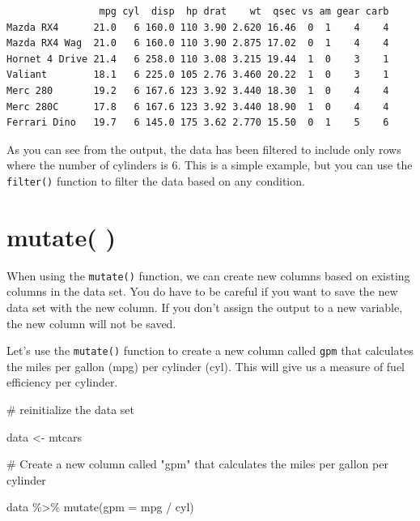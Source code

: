 \documentclass[
  letterpaper,
  DIV=11,
  numbers=noendperiod]{scrreprt}
\newenvironment{Shaded}{\begin{snugshade}}{\end{snugshade}}
\newcommand{\AttributeTok}[1]{\textcolor[rgb]{0.40,0.45,0.13}{#1}}
\newcommand{\CommentTok}[1]{\textcolor[rgb]{0.37,0.37,0.37}{#1}}
\newcommand{\FunctionTok}[1]{\textcolor[rgb]{0.28,0.35,0.67}{#1}}
\newcommand{\NormalTok}[1]{\textcolor[rgb]{0.00,0.23,0.31}{#1}}
\newcommand{\OtherTok}[1]{\textcolor[rgb]{0.00,0.23,0.31}{#1}}
\newcommand{\SpecialCharTok}[1]{\textcolor[rgb]{0.37,0.37,0.37}{#1}}
\begin{document}
\begin{verbatim}
                mpg cyl  disp  hp drat    wt  qsec vs am gear carb
Mazda RX4      21.0   6 160.0 110 3.90 2.620 16.46  0  1    4    4
Mazda RX4 Wag  21.0   6 160.0 110 3.90 2.875 17.02  0  1    4    4
Hornet 4 Drive 21.4   6 258.0 110 3.08 3.215 19.44  1  0    3    1
Valiant        18.1   6 225.0 105 2.76 3.460 20.22  1  0    3    1
Merc 280       19.2   6 167.6 123 3.92 3.440 18.30  1  0    4    4
Merc 280C      17.8   6 167.6 123 3.92 3.440 18.90  1  0    4    4
Ferrari Dino   19.7   6 145.0 175 3.62 2.770 15.50  0  1    5    6
\end{verbatim}

As you can see from the output, the data has been filtered to include
only rows where the number of cylinders is 6. This is a simple example,
but you can use the \texttt{filter()} function to filter the data based
on any condition.

\section*{mutate( )}\label{mutate}


When using the \texttt{mutate()} function, we can create new columns
based on existing columns in the data set. You do have to be careful if
you want to save the new data set with the new column. If you don't
assign the output to a new variable, the new column will not be saved.

Let's use the \texttt{mutate()} function to create a new column called
\texttt{gpm} that calculates the miles per gallon (mpg) per cylinder
(cyl). This will give us a measure of fuel efficiency per cylinder.

\begin{Shaded}
\begin{Highlighting}[]
\CommentTok{\# reinitialize the data set}

\NormalTok{data }\OtherTok{\textless{}{-}}\NormalTok{ mtcars}

\CommentTok{\# Create a new column called "gpm" that calculates the miles per gallon per cylinder}

\NormalTok{data }\SpecialCharTok{\%\textgreater{}\%}
  \FunctionTok{mutate}\NormalTok{(}\AttributeTok{gpm =}\NormalTok{ mpg }\SpecialCharTok{/}\NormalTok{ cyl)}
\end{Highlighting}
\end{Shaded}
\end{document}
